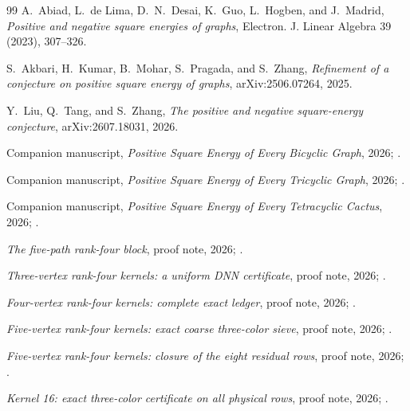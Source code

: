 \documentclass[11pt]{article}
\theoremstyle{remark}
\begin{document}
\begin{thebibliography}{99}
A.~Abiad, L.~de Lima, D.~N.~Desai, K.~Guo, L.~Hogben, and J.~Madrid,
\emph{Positive and negative square energies of graphs},
Electron. J. Linear Algebra 39 (2023), 307--326.

S.~Akbari, H.~Kumar, B.~Mohar, S.~Pragada, and S.~Zhang,
\emph{Refinement of a conjecture on positive square energy of graphs},
arXiv:2506.07264, 2025.

Y.~Liu, Q.~Tang, and S.~Zhang,
\emph{The positive and negative square-energy conjecture},
arXiv:2607.18031, 2026.

Companion manuscript, \emph{Positive Square Energy of Every Bicyclic Graph},
2026; .

Companion manuscript, \emph{Positive Square Energy of Every Tricyclic Graph},
2026; .

Companion manuscript, \emph{Positive Square Energy of Every Tetracyclic
Cactus}, 2026; .

\emph{The five-path rank-four block}, proof note, 2026;
.

\emph{Three-vertex rank-four kernels: a uniform DNN certificate}, proof note,
2026; .

\emph{Four-vertex rank-four kernels: complete exact ledger}, proof note, 2026;
.

\emph{Five-vertex rank-four kernels: exact coarse three-color sieve}, proof
note, 2026;
.

\emph{Five-vertex rank-four kernels: closure of the eight residual rows}, proof
note, 2026;
.

\emph{Kernel 16: exact three-color certificate on all physical rows}, proof
note, 2026;
.


\end{thebibliography}
\end{document}
